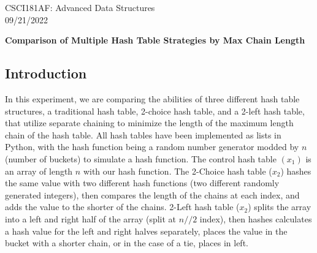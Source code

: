 \documentclass[11pt]{article}
\begin{document}
CSCI181AF: Advanced Data Structures\\
09/21/2022
\begin{center}
    \bf{Comparison of Multiple Hash Table Strategies by Max Chain Length}
\end{center}
\subsection*{Introduction}
In this experiment, we are comparing the abilities of three different hash table structures, a traditional hash table, 2-choice hash table, and a 2-left hash table, that utilize separate chaining to minimize the length of 
the maximum length chain of the hash table. All hash tables have been implemented as lists in Python, with the hash function being a random number generator modded by $n$ (number of buckets) to simulate a hash function.
The control hash table $(x_1)$ is an array of length $n$ with our hash function. The 2-Choice hash table ($x_2$) hashes the same value with two different hash functions (two different randomly generated integers), then compares the length of the chains at each index, and adds the value to the shorter of the chains.
2-Left hash table ($x_2$) splits the array into a left and right half of the array (split at $n//2$ index), then hashes calculates a hash value for the left and right halves separately, places the value in the bucket with a shorter chain, or in the case of a tie,
places in left.
\vspace{-3mm}
\end{document}
